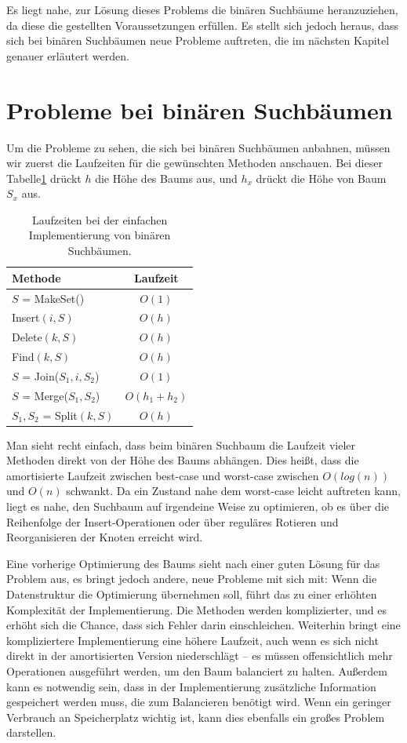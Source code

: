 \documentclass[a4paper]{scrreprt}
\theoremstyle{definition}
\begin{document}
Es liegt nahe, zur Lösung dieses Problems die binären Suchbäume heranzuziehen, da diese die gestellten Voraussetzungen erfüllen.
Es stellt sich jedoch heraus, dass sich bei binären Suchbäumen neue Probleme auftreten, die im nächsten Kapitel genauer erläutert werden.

\section{Probleme bei binären Suchbäumen}
\label{sec:binaryproblems}

Um die Probleme zu sehen, die sich bei binären Suchbäumen anbahnen, müssen wir zuerst die Laufzeiten für die gewünschten Methoden anschauen. Bei dieser Tabelle\ref{tab:binarytree} drückt $h$ die Höhe des Baums aus, und $h_x$ drückt die Höhe von Baum $S_x$ aus.

\begin{table}
\centering
\begin{tabular}{l|c}
	Methode & Laufzeit\\
	\hline
	$S$ = MakeSet() & $O(1)$\\
	Insert$(i, S)$ & $O(h)$ \\
	Delete$(k, S)$ & $O(h)$ \\
	Find$(k, S)$ & $O(h)$ \\
	$S$ = Join($S_1, i, S_2$) & $O(1)$ \\
	$S$ = Merge($S_1, S_2$) & $O(h_1 + h_2)$ \\
	$S_1, S_2$ = Split$(k, S)$ & $O(h)$
\end{tabular}
\caption[Laufzeiten Binärbaum]{Laufzeiten bei der einfachen Implementierung von binären Suchbäumen.} %
\label{tab:binarytree}
\end{table}

Man sieht recht einfach, dass beim binären Suchbaum die Laufzeit vieler Methoden direkt von der Höhe des Baums abhängen.
Dies heißt, dass die amortisierte Laufzeit zwischen best-case und worst-case zwischen $O(log(n))$ und $O(n)$ schwankt.
Da ein Zustand nahe dem worst-case leicht auftreten kann, liegt es nahe, den Suchbaum auf irgendeine Weise zu optimieren, ob es über die Reihenfolge der Insert-Operationen oder über reguläres Rotieren und Reorganisieren der Knoten erreicht wird.

Eine vorherige Optimierung des Baums sieht nach einer guten Lösung für das Problem aus, es bringt jedoch andere, neue Probleme mit sich mit:
Wenn die Datenstruktur die Optimierung übernehmen soll, führt das zu einer erhöhten Komplexität der Implementierung.
Die Methoden werden komplizierter, und es erhöht sich die Chance, dass sich Fehler darin einschleichen.
Weiterhin bringt eine kompliziertere Implementierung eine höhere Laufzeit, auch wenn es sich nicht direkt in der amortisierten Version niederschlägt -- es müssen offensichtlich mehr Operationen ausgeführt werden, um den Baum balanciert zu halten.
Außerdem kann es notwendig sein, dass in der Implementierung zusätzliche Information gespeichert werden muss, die zum Balancieren benötigt wird.
Wenn ein geringer Verbrauch an Speicherplatz wichtig ist, kann dies ebenfalls ein großes Problem darstellen.
\end{document}
